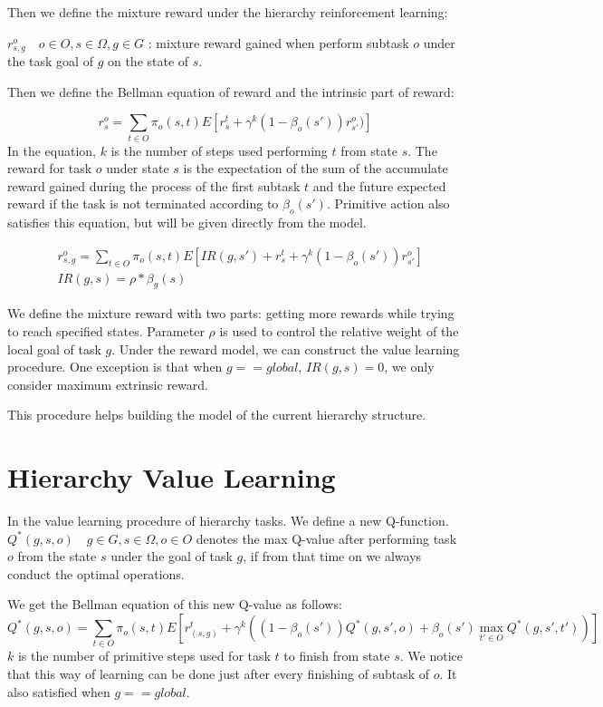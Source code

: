 \documentclass{article}
\begin{document}
Then we define the mixture reward under the hierarchy reinforcement learning:

$r^o_{s,g} \quad o\in{O},s\in{\Omega},g\in{G}$ : mixture reward gained when perform subtask $o$ under the task goal of $g$ on the state of $s$.

Then we define the Bellman equation of reward and the intrinsic part of reward:

\begin{equation}\label{reward_function}
r^o_s=\sum_{t\in{O}}{\pi_o(s,t)E[r^t_s + \gamma^k(1-\beta_o(s'))r^o_{s'})]}
\end{equation}
In the equation, $k$ is the number of steps used performing $t$ from state $s$. The reward for task $o$ under state $s$ is the expectation of the sum of the accumulate reward gained during the process of the first subtask $t$ and the future expected reward if the task is not terminated according to $\beta_o(s')$. Primitive action also satisfies this equation, but will be given directly from the model.

\begin{eqnarray}\label{reward_function2}
& r^o_{s,g}=\sum_{t\in{O}}{\pi_o(s,t)E[IR(g,s')+r^t_s + \gamma^k(1-\beta_o(s'))r^o_{s'}]} \\
& IR(g,s) =\rho * \beta_g{(s)}
\end{eqnarray}

We define the mixture reward with two parts: getting more rewards while trying to reach specified states. Parameter $\rho$ is used to control the relative weight of the local goal of task $g$. Under the reward model, we can construct the value learning procedure. One exception is that when $g==global$, $IR(g,s)=0$, we only consider maximum extrinsic reward.

This procedure helps building the model of the current hierarchy structure.

\section{\label{sub:HVL}Hierarchy Value Learning}
In the value learning procedure of hierarchy tasks. We define a new Q-function. $Q^*(g,s,o) \quad g\in G,s\in \Omega, o\in O$ denotes the max Q-value after performing task $o$ from the state $s$ under the goal of task $g$, if from that time on we always conduct the optimal operations.

We get the Bellman equation of this new Q-value as follows:
\begin{equation}\label{Q_function}
Q^*(g,s,o) = \sum_{t\in O}{\pi_o(s,t)E[r^t_{(s,g)}+\gamma^k((1-\beta_o(s'))Q^*(g,s',o)+\beta_o(s')\max \limits_{t'\in O}Q^*(g,s',t'))]}
\end{equation}
$k$ is the number of primitive steps used for task $t$ to finish from state $s$. We notice that this way of learning can be done just after every finishing of subtask of $o$. It also satisfied when $g==global$.
\end{document}
